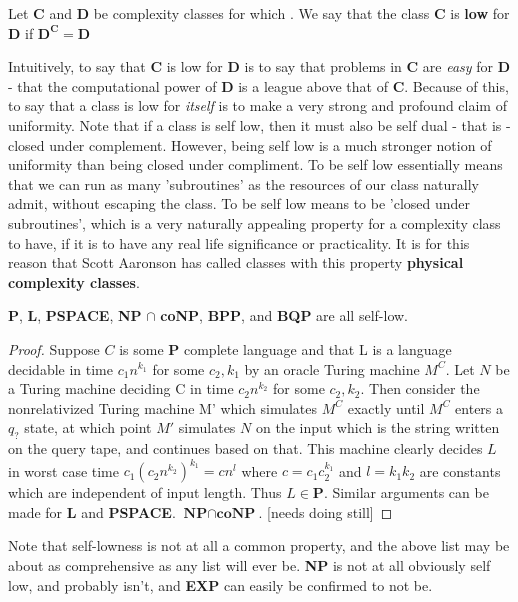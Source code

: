 \begin{definition}
    Let \textbf{C} and \textbf{D} be complexity classes for which . We say that the class \textbf{C} is \textbf{low} for \textbf{D} if $\textbf{D}^{\textbf{C}} = \textbf{D}$
\end{definition}
Intuitively, to say that \textbf{C} is low for \textbf{D} is to say that problems in \textbf{C} are \textit{easy} for \textbf{D} - that the computational power of \textbf{D} is a league above that of \textbf{C}. Because of this, to say that a class is low for \textit{itself} is to make a very strong and profound claim of uniformity. Note that if a class is self low, then it must also be self dual - that is - closed under complement. However, being self low is a much stronger notion of uniformity than being closed under compliment. To be self low essentially means that we can run as many 'subroutines' as the resources of our class naturally admit, without escaping the class. To be self low means to be 'closed under subroutines', which is a very naturally appealing property for a complexity class to have, if it is to have any real life significance or practicality. It is for this reason that Scott Aaronson has called classes with this property \textbf{physical complexity classes}.
\begin{theorem}
    \textbf{P}, \textbf{L}, \textbf{PSPACE}, \textbf{NP} $\cap$ \textbf{coNP}, \textbf{BPP}, and \textbf{BQP} are all self-low.
\end{theorem}
\begin{proof}
    Suppose $C$ is some \textbf{P} complete language and that L is a language decidable in time $c_1n^{k_1}$ for some $c_2,k_1$ by an oracle Turing machine $M^C$. Let $N$ be a Turing machine deciding C in time $c_2n^{k_2}$ for some $c_2,k_2$. Then consider the nonrelativized Turing machine M' which simulates $M^C$ exactly until $M^C$ enters a $q_?$ state, at which point $M'$ simulates $N$ on the input which is the string written on the query tape, and continues based on that. This machine clearly decides $L$ in worst case time $c_1(c_2n^{k_2})^{k_1} = cn^l$ where $c=c_1c_2^{k_1}$ and $l=k_1k_2$ are constants which are independent of input length. Thus $L \in \textbf{P}$. Similar arguments can be made for \textbf{L} and \textbf{PSPACE}. $\textbf{NP} \cap \textbf{coNP}$. [needs doing still]
\end{proof}
\par 
Note that self-lowness is not at all a common property, and the above list may be about as comprehensive as any list will ever be. \textbf{NP} is not at all obviously self low, and probably isn't, and \textbf{EXP} can easily be confirmed to not be. 

